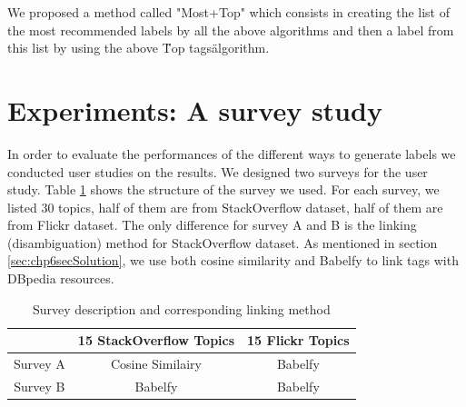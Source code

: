 We proposed a method called "Most+Top" which consists in creating the list of the most recommended labels by all the above algorithms and then a label from this list by using the above \"Top tags\" algorithm. 


\section{Experiments: A survey study}
In order to evaluate the performances of the different ways to generate labels we conducted user studies on the results. We designed two surveys for the user study. Table \ref{tab:chp6survey} shows the structure of the survey we used. For each survey, we listed 30 topics, half of them are from StackOverflow dataset, half of them are from Flickr dataset. 
The only difference for survey A and B is the linking (disambiguation) method for StackOverflow dataset. As mentioned in section \ref{sec:chp6secSolution}, we use both cosine similarity and Babelfy to link tags with DBpedia resources. 



\begin{table}[htp]
\caption{Survey description and corresponding linking method}
\label{tab:chp6survey}
\centering
\begin{tabular}{|c|c|c|}
\hline
             &  15 StackOverflow Topics & 15 Flickr Topics \\ \hline
    Survey A & Cosine Similairy & Babelfy\\ \hline  
    Survey B &  Babelfy          & Babelfy\\ \hline
\end{tabular}

\end{table}


